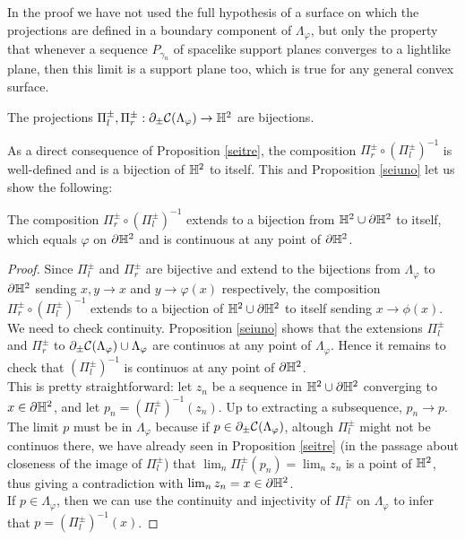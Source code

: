 \begin{observation}
In the proof we have not used the full hypothesis of a surface on which the projections are defined in a boundary component of $\Lambda_\varphi$, but only the property that whenever a sequence $P_{\gamma_n}$ of spacelike support planes converges to a lightlike plane, then this limit is a support plane too, which is true for any general convex surface.
\end{observation}



\begin{proposition}\label{seitre}
    The projections $\Pi_l^\pm, \Pi_r^\pm:\partial_\pm\mathcal{C}(\Lambda_\varphi)\to\mathbb{H}^2$ are bijections. 
\end{proposition}

As a direct consequence of Proposition \ref{seitre}, the composition $\Pi_r^\pm\circ(\Pi_l^\pm)^{-1}$ is well-defined and is a bijection of $\mathbb{H}^2$ to itself. This and Proposition \ref{seiuno} let us show the following: 

\begin{corollary}\label{seiquattro}
    The composition $\Pi_r^\pm\circ(\Pi_l^\pm)^{-1}$ extends to a bijection from $\mathbb{H}^2\cup\partial\mathbb{H}^2$ to itself, which equals $\varphi$ on $\partial\mathbb{H}^2$ and is continuous at any point of $\partial\mathbb{H}^2$.
\end{corollary}
\begin{proof}
    Since $\Pi_l^\pm$ and $\Pi_r^\pm$ are bijective and extend to the bijections from $\Lambda_\varphi$ to $\partial\mathbb{H}^2$ sending $x,y\to x$ and $y\to\varphi(x)$ respectively, the composition $\Pi_r^\pm\circ(\Pi_l^\pm)^{-1}$ extends to a bijection of $\mathbb{H}^2\cup\partial\mathbb{H}^2$ to itself sending $x\to \phi(x).$ \\
    We need to check continuity. Proposition \ref{seiuno} shows that the extensions $\Pi_l^\pm$ and $\Pi_r^\pm$ to $\partial_\pm\mathcal{C}(\Lambda_\varphi)\cup\Lambda_\varphi$ are continuos at any point of $\Lambda_\varphi$. Hence it remains to check that $(\Pi_l^\pm)^{-1}$ is continuos at any point of $\partial\mathbb{H}^{2}$.\\
    This is pretty straightforward: let $z_n$ be a sequence in $\mathbb{H}^2\cup\partial\mathbb{H}^2$ converging to $x\in\partial\mathbb{H}^2$, and let $p_n=(\Pi_l^\pm)^{-1}(z_n)$. Up to extracting a subsequence, $p_n\to p$. The limit $p$ must be in $\Lambda_\varphi$ because if $p\in\partial_\pm\mathcal{C}(\Lambda_\varphi)$, altough $\Pi_l^\pm$ might not be continuos there, we have already seen in Proposition \ref{seitre} (in the passage about closeness of the image of $\Pi_l^\pm$) that $\lim_n\Pi_l^\pm(p_n)=\lim_n z_n$ is a point of $\mathbb{H}^2$, thus giving a contradiction with $\lim_n z_n=x\in\partial\mathbb{H}^2$. \\ 
    If $p\in\Lambda_\varphi$, then we can use the continuity and injectivity of $\Pi_l^\pm$ on $\Lambda_\varphi$ to infer that $p=(\Pi_l^\pm)^{-1}(x)$.

\end{proof}

